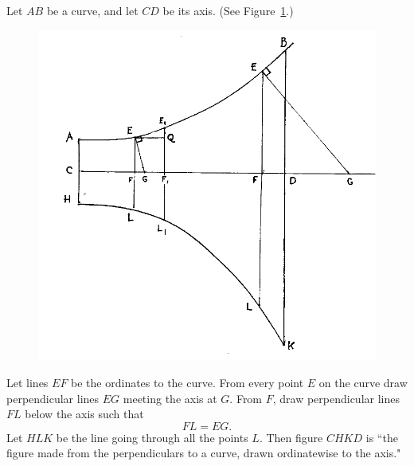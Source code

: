 \documentclass[polutonikogreek,english,twoside,openright]{article}
\begin{document}
Let $AB$ be a curve, and let $CD$ be its axis. (See Figure~\ref{acurve}.)
\begin{figure}[ht]
\begin{center}
\includegraphics[width=\textwidth]{fig/Figure44}
\caption{}
\label{acurve}
\vspace{-10pt}
\end{center}
\end{figure} 
Let lines $EF$ be the ordinates to the curve.  From every point $E$ on
the curve draw perpendicular lines $EG$ meeting the axis at $G$.  From
$F$, draw perpendicular lines $FL$ below the axis such that
$$FL = EG.$$
Let $HLK$ be the line going through all the points $L$.  Then figure
$CHKD$ is ``the figure made from the perpendiculars to a curve, drawn
ordinatewise to the axis."
\end{document}

